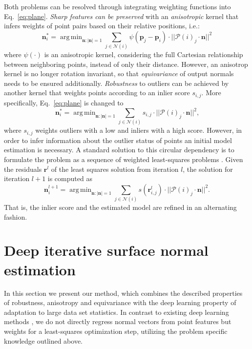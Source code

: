 \documentclass[10pt,twocolumn,letterpaper]{article}
\DeclareMathOperator*{\argmin}{arg\,min}
\begin{document}
Both problems can be resolved through integrating weighting functions into Eq.~\ref{eq:plane}. \emph{Sharp features can be preserved} with an \emph{anisotropic} kernel that infers weights of
point pairs based on their relative positions, i.e.: 
\begin{equation}
\label{eq:aniso}
    \mathbf{n}_i^\ast = \argmin_{\mathbf{n}:|\mathbf{n}|=1} \sum_{j\in\mathcal{N}(i)} \psi(\mathbf{p}_j - \mathbf{p}_i) \cdot || \mathcal{P}(i)_j\cdot \mathbf{n} ||^2
\end{equation}
where $\psi(\cdot)$ is an anisotropic kernel, considering the full Cartesian relationship between neighboring points, instead of only their distance. However, an anisotrop kernel is no longer rotation invariant, so that \emph{equivariance} of output normals needs to be ensured additionally. 
\emph{Robustness} to outliers can be achieved by another kernel that weights points 
according to an inlier score $s_{i, j}$. 
More specifically, Eq.~\ref{eq:plane} is changed to 
\begin{equation}
\label{eq:outlier}
    \mathbf{n}_i^\ast = \argmin_{\mathbf{n}:|\mathbf{n}|=1} \sum_{j\in\mathcal{N}(i)} s_{i,j} \cdot || \mathcal{P}(i)_j\cdot \mathbf{n} ||^2 \textrm{,}
\end{equation}
where $s_{i,j}$ weights outliers with a low and inliers with a high score. However, in order to infer information about the outlier status of points an initial model estimation is necessary. A standard solution to this circular dependency is to formulate the problem as a sequence of weighted least-squares problems \cite{Holland:1977, Ranftl:2018}. Given the residuals $\mathbf{r}^l$ of the least squares solution from iteration $l$, the solution for iteration $l+1$ is computed as
\begin{equation}
\label{eq:it_optim}
    \mathbf{n}_i^{l+1} = \argmin_{\mathbf{n}:|\mathbf{n}|=1} \sum_{j\in\mathcal{N}(i)} s(\mathbf{r}^l_{i, j}) \cdot || \mathcal{P}(i)_j\cdot \mathbf{n} ||^2 \textrm{.}
\end{equation}
That is, the inlier score and the estimated model are refined in an alternating fashion.










\section{Deep iterative surface normal estimation}
In this section we present our method, which combines the described properties of robustness, anisotropy and equivariance with the deep learning property of adaptation to large data set statistics. In contrast to existing deep learning methods \cite{Ben-Shabat:2018, Guerrero:2018}, we do not directly regress normal vectors from point features but weights for a least-squares optimization step, utilizing the problem specific knowledge outlined above.
\end{document}
